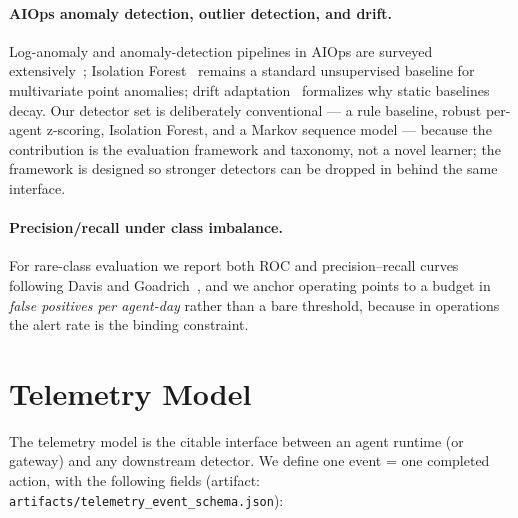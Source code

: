 \documentclass[10pt]{article}
\newcommand{\code}[1]{\texttt{#1}}
\begin{document}
\paragraph{AIOps anomaly detection, outlier detection, and drift.}
Log-anomaly and anomaly-detection pipelines in AIOps are surveyed
extensively~\cite{he2021}; Isolation Forest~\cite{iforest} remains a standard
unsupervised baseline for multivariate point anomalies; drift
adaptation~\cite{gama2014} formalizes why static baselines decay. Our detector
set is deliberately conventional --- a rule baseline, robust per-agent
z-scoring, Isolation Forest, and a Markov sequence model --- because the
contribution is the evaluation framework and taxonomy, not a novel learner;
the framework is designed so stronger detectors can be dropped in behind the
same interface.

\paragraph{Precision/recall under class imbalance.}
For rare-class evaluation we report both ROC and precision--recall curves
following Davis and Goadrich~\cite{davis2006}, and we anchor operating points
to a budget in \emph{false positives per agent-day} rather than a bare
threshold, because in operations the alert rate is the binding constraint.

\section{Telemetry Model}
\label{sec:telemetry}

The telemetry model is the citable interface between an agent runtime (or
gateway) and any downstream detector. We define one event = one completed
action, with the following fields (artifact:
\code{artifacts/telemetry\_event\_schema.json}):
\end{document}
